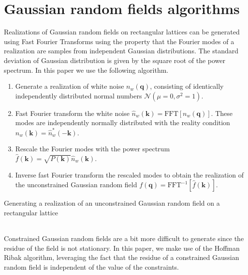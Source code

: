 \documentclass[a4paper, 11pt]{article}
\begin{document}
\appendix

\section{Gaussian random fields algorithms}\label{ap:GRF}
Realizations of Gaussian random fields on rectangular lattices can be generated using Fast Fourier Transforms using the property that the Fourier modes of a realization are samples from independent Gaussian distributions. The standard deviation of Gaussian distribution is given by the square root of the power spectrum. In this paper we use the following algorithm.\\


\begin{algorithm}[H]
\SetAlgoLined
\begin{enumerate}[itemsep=1ex, leftmargin=0cm, rightmargin=1cm]
\item Generate a realization of white noise $n_w(\bm{q})$, consisting of identically independently distributed normal numbers $\mathcal{N}(\mu=0,\sigma^2=1)$.
\item Fast Fourier transform the white noise $\hat{n}_w(\bm{k}) = \text{FFT}[n_w(\bm{q})]$. These modes are independently normally distributed with the reality condition $\hat{n}_w(\bm{k}) = \hat{n}_w^*(-\bm{k})$.
\item Rescale the Fourier modes with the power spectrum $\hat{f}(\bm{k}) = \sqrt{P(\bm{k})}\hat{n}_w(\bm{k})$.
\item Inverse fast Fourier transform the rescaled modes to obtain the realization of the unconstrained Gaussian random field $f(\bm{q}) = \text{FFT}^{-1}[\hat{f}(\bm{k})]$.
\end{enumerate}
 \caption{Generating a realization of an unconstrained Gaussian random field on a rectangular lattice}
 \label{alg:GRF}
\end{algorithm}$ $\\


Constrained Gaussian random fields are a bit more difficult to generate since the residue of the field is not stationary. In this paper, we make use of the Hoffman Ribak algorithm, leveraging the fact that the residue of a constrained Gaussian random field is independent of the value of the constraints.\\
\end{document}
